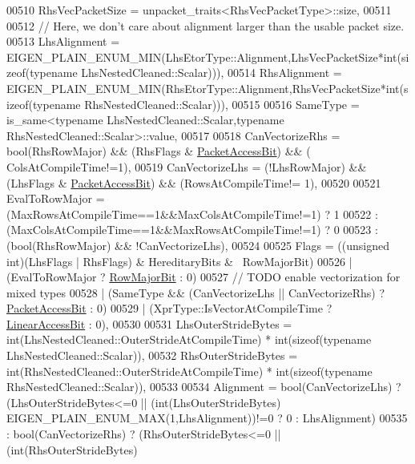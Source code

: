 \begin{DoxyCode}
00510     RhsVecPacketSize = unpacket\_traits<RhsVecPacketType>::size,
00511 
00512     \textcolor{comment}{// Here, we don't care about alignment larger than the usable packet size.}
00513     LhsAlignment = EIGEN\_PLAIN\_ENUM\_MIN(LhsEtorType::Alignment,LhsVecPacketSize*\textcolor{keywordtype}{int}(\textcolor{keyword}{sizeof}(\textcolor{keyword}{typename} 
      LhsNestedCleaned::Scalar))),
00514     RhsAlignment = EIGEN\_PLAIN\_ENUM\_MIN(RhsEtorType::Alignment,RhsVecPacketSize*\textcolor{keywordtype}{int}(\textcolor{keyword}{sizeof}(\textcolor{keyword}{typename} 
      RhsNestedCleaned::Scalar))),
00515       
00516     SameType = is\_same<typename LhsNestedCleaned::Scalar,typename RhsNestedCleaned::Scalar>::value,
00517 
00518     CanVectorizeRhs = bool(RhsRowMajor) && (RhsFlags & \hyperlink{group__flags_ga1a306a438e1ab074e8be59512e887b9f}{PacketAccessBit}) && (
      ColsAtCompileTime!=1),
00519     CanVectorizeLhs = (!LhsRowMajor) && (LhsFlags & \hyperlink{group__flags_ga1a306a438e1ab074e8be59512e887b9f}{PacketAccessBit}) && (RowsAtCompileTime!=
      1),
00520 
00521     EvalToRowMajor = (MaxRowsAtCompileTime==1&&MaxColsAtCompileTime!=1) ? 1
00522                     : (MaxColsAtCompileTime==1&&MaxRowsAtCompileTime!=1) ? 0
00523                     : (\textcolor{keywordtype}{bool}(RhsRowMajor) && !CanVectorizeLhs),
00524 
00525     Flags = ((\textcolor{keywordtype}{unsigned} \textcolor{keywordtype}{int})(LhsFlags | RhsFlags) & HereditaryBits & ~RowMajorBit)
00526           | (EvalToRowMajor ? \hyperlink{group__flags_gae4f56c2a60bbe4bd2e44c5b19cbe8762}{RowMajorBit} : 0)
00527           \textcolor{comment}{// TODO enable vectorization for mixed types}
00528           | (SameType && (CanVectorizeLhs || CanVectorizeRhs) ? \hyperlink{group__flags_ga1a306a438e1ab074e8be59512e887b9f}{PacketAccessBit} : 0)
00529           | (XprType::IsVectorAtCompileTime ? \hyperlink{group__flags_ga4b983a15d57cd55806df618ac544d09e}{LinearAccessBit} : 0),
00530           
00531     LhsOuterStrideBytes = int(LhsNestedCleaned::OuterStrideAtCompileTime) * int(\textcolor{keyword}{sizeof}(\textcolor{keyword}{typename} 
      LhsNestedCleaned::Scalar)),
00532     RhsOuterStrideBytes = int(RhsNestedCleaned::OuterStrideAtCompileTime) * int(\textcolor{keyword}{sizeof}(\textcolor{keyword}{typename} 
      RhsNestedCleaned::Scalar)),
00533 
00534     Alignment = bool(CanVectorizeLhs) ? (LhsOuterStrideBytes<=0 || (int(LhsOuterStrideBytes) %
      EIGEN\_PLAIN\_ENUM\_MAX(1,LhsAlignment))!=0 ? 0 : LhsAlignment)
00535               : bool(CanVectorizeRhs) ? (RhsOuterStrideBytes<=0 || (int(RhsOuterStrideBytes) %

\end{DoxyCode}
